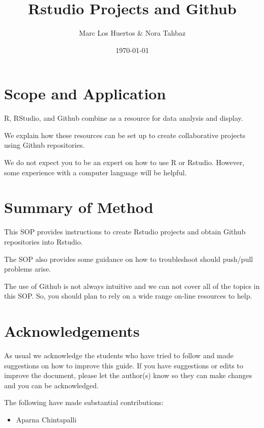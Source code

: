 \documentclass[12pt]{../SOP4_alpha}
\author{Marc Los Huertos \& Nora Tahbaz}
\title{Rstudio Projects and Github}
\date{\today}
\begin{document}


\maketitle

\section{Scope and Application}

\NP R, RStudio, and Github combine as a resource for data analysis and display.

\NP We explain how these resources can be set up to create collaborative projects using Github repositories. 

\NP We do not expect you to be an expert on how to use R or Rstudio. However, some experience with a computer language will be helpful. 

\section{Summary of Method}

\NP This SOP provides instructions to create Rstudio projects and obtain Github repositories into Rstudio. 

\NP The SOP also provides some guidance on how to troubleshoot should push/pull problems arise.

\NP The use of Github is not always intuitive and we can not cover all of the topics in this SOP. So, you should plan to rely on a wide range on-line resources to help.

\tableofcontents

\newpage

\section{Acknowledgements}

As usual we acknowledge the students who have tried to follow and made suggestions on how to improve this guide. If you have suggestions or edits to improve the document, please let the author(s) know so they can make changes and you can be acknowledged.

The following have made substantial contributions:

\begin{itemize}
\item Aparna Chintapalli
\end{itemize}
\end{document}
